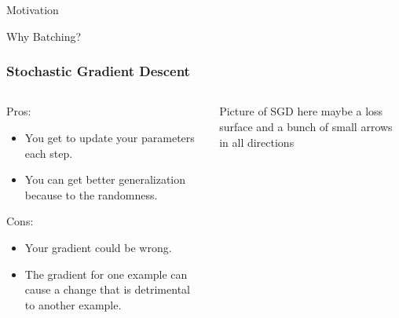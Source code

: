 \documentclass{beamer}
\begin{document}
\begin{section}{Motivation}
\begin{subsection}{Why Batching?}
        \begin{frame}
            \frametitle{Stochastic Gradient Descent}
            \begin{columns}
                \begin{column}{0.5\textwidth}
                    Pros:
                    \begin{itemize}
                        \item You get to update your parameters each step.
                        \item You can get better generalization because to the randomness.
                    \end{itemize}
                    Cons:
                    \begin{itemize}
                        \item Your gradient could be wrong.
                        \item The gradient for one example can cause a change that is detrimental to another example.
                    \end{itemize}
                \end{column}
                \begin{column}{0.5\textwidth}
                    Picture of SGD here maybe a loss surface and a bunch of small arrows in all directions
                \end{column}
            \end{columns}

        \end{frame}


\end{subsection}
\end{section}
\end{document}
